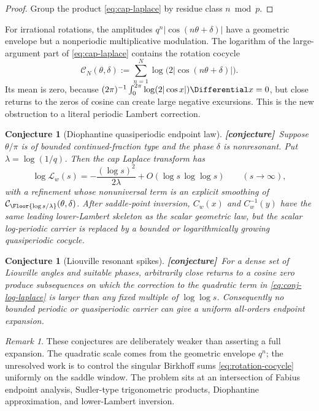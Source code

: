 \documentclass[11pt,oneside]{article}
\newtheorem{conjecture}[theorem]{Conjecture}
\theoremstyle{definition}
\theoremstyle{remark}
\newtheorem{remark}[theorem]{Remark}
\newcommand{\Conj}{\textcolor{burgundy}{\textbf{[conjecture]}}}
\begin{document}
\begin{proof}
Group the product \eqref{eq:cap-laplace} by residue class $n\bmod p$.
\end{proof}

For irrational rotations, the amplitudes
$q^n|\cos(n\theta+\delta)|$ have a geometric envelope but a nonperiodic
multiplicative modulation.  The logarithm of the large-argument part of
\eqref{eq:cap-laplace} contains the rotation cocycle
\begin{equation}
 \mathcal C_N(\theta,\delta)
 :=\sum_{n=1}^N\log\bigl(2|\cos(n\theta+\delta)|\bigr).
 \label{eq:rotation-cocycle}
\end{equation}
Its mean is zero, because
$(2\pi)^{-1}\int_0^{2\pi}\log(2|\cos x|)\Differential x=0$, but close returns to the zeros
of cosine can create large negative excursions.  This is the new obstruction to
a literal periodic Lambert correction.

\begin{conjecture}[Diophantine quasiperiodic endpoint law]
\label{conj:diophantine-endpoint}
\Conj\ Suppose $\theta/\pi$ is of bounded continued-fraction type and the phase
$\delta$ is nonresonant.  Put $\lambda=\log(1/q)$.  Then the cap Laplace transform
has
\begin{equation}
 \log\mathcal L_w(s)
 =-\frac{(\log s)^2}{2\lambda}
  +O(\log s\,\log\log s)
 \qquad(s\to\infty),
 \label{eq:conj-log-laplace}
\end{equation}
with a refinement whose nonuniversal term is an explicit smoothing of
$\mathcal C_{\Floor{\log s/\lambda}}(\theta,\delta)$.  After saddle-point
inversion, $C_w(x)$ and $C_w^{-1}(y)$ have the same leading lower-Lambert
skeleton as the scalar geometric law, but the scalar log-periodic carrier is
replaced by a bounded or logarithmically growing quasiperiodic cocycle.
\end{conjecture}

\begin{conjecture}[Liouville resonant spikes]
\label{conj:liouville}
\Conj\ For a dense set of Liouville angles and suitable phases, arbitrarily close
returns to a cosine zero produce subsequences on which the correction to the
quadratic term in \eqref{eq:conj-log-laplace} is larger than any fixed multiple
of $\log\log s$.  Consequently no bounded periodic or quasiperiodic carrier can
give a uniform all-orders endpoint expansion.
\end{conjecture}

\begin{remark}
These conjectures are deliberately weaker than asserting a full expansion.  The
quadratic scale comes from the geometric envelope $q^n$; the unresolved work is
to control the singular Birkhoff sums \eqref{eq:rotation-cocycle} uniformly on
the saddle window.  The problem sits at an intersection of Fabius endpoint
analysis, Sudler-type trigonometric products, Diophantine approximation, and
lower-Lambert inversion.
\end{remark}
\end{document}
